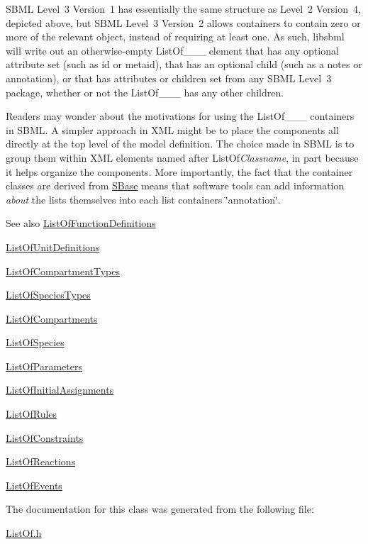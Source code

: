S\+B\+ML Level~3 Version~1 has essentially the same structure as Level~2 Version~4, depicted above, but S\+B\+ML Level~3 Version~2 allows containers to contain zero or more of the relevant object, instead of requiring at least one. As such, libsbml will write out an otherwise-\/empty List\+Of\+\_\+\+\_\+\+\_\+ element that has any optional attribute set (such as \textquotesingle{}id\textquotesingle{} or \textquotesingle{}metaid\textquotesingle{}), that has an optional child (such as a \textquotesingle{}notes\textquotesingle{} or \textquotesingle{}annotation\textquotesingle{}), or that has attributes or children set from any S\+B\+ML Level~3 package, whether or not the List\+Of\+\_\+\+\_\+\+\_\+ has any other children.

Readers may wonder about the motivations for using the List\+Of\+\_\+\+\_\+\+\_\+ containers in S\+B\+ML. A simpler approach in X\+ML might be to place the components all directly at the top level of the model definition. The choice made in S\+B\+ML is to group them within X\+ML elements named after List\+Of{\itshape Classname}, in part because it helps organize the components. More importantly, the fact that the container classes are derived from \hyperlink{class_s_base}{S\+Base} means that software tools can add information {\itshape about} the lists themselves into each list container\textquotesingle{}s \char`\"{}annotation\char`\"{}.

\begin{DoxySeeAlso}{See also}
\hyperlink{class_list_of_function_definitions}{List\+Of\+Function\+Definitions} 

\hyperlink{class_list_of_unit_definitions}{List\+Of\+Unit\+Definitions} 

\hyperlink{class_list_of_compartment_types}{List\+Of\+Compartment\+Types} 

\hyperlink{class_list_of_species_types}{List\+Of\+Species\+Types} 

\hyperlink{class_list_of_compartments}{List\+Of\+Compartments} 

\hyperlink{class_list_of_species}{List\+Of\+Species} 

\hyperlink{class_list_of_parameters}{List\+Of\+Parameters} 

\hyperlink{class_list_of_initial_assignments}{List\+Of\+Initial\+Assignments} 

\hyperlink{class_list_of_rules}{List\+Of\+Rules} 

\hyperlink{class_list_of_constraints}{List\+Of\+Constraints} 

\hyperlink{class_list_of_reactions}{List\+Of\+Reactions} 

\hyperlink{class_list_of_events}{List\+Of\+Events} 
\end{DoxySeeAlso}


The documentation for this class was generated from the following file\+:\begin{DoxyCompactItemize}
\item 
\hyperlink{_list_of_8h}{List\+Of.\+h}\end{DoxyCompactItemize}
